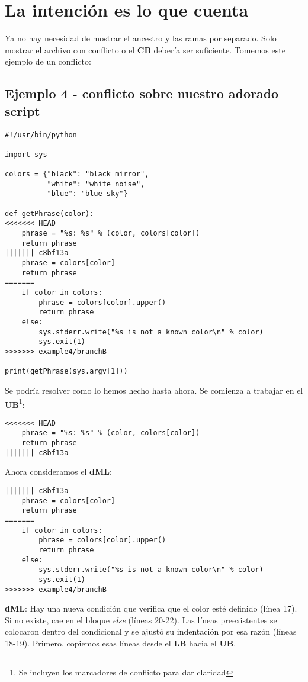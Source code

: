 
\section{La intención es lo que cuenta}
Ya no hay necesidad de mostrar el ancestro y las ramas por separado. Solo mostrar el archivo con conflicto
o el {\bf CB} debería ser suficiente. Tomemos este ejemplo de un conflicto:

\subsection{Ejemplo 4 - conflicto sobre nuestro adorado script}
\label{example_04}

\begin{lstlisting}[style=python_style, caption={\bf Ejemplo 4}]
#!/usr/bin/python

import sys

colors = {"black": "black mirror",
          "white": "white noise",
          "blue": "blue sky"}

def getPhrase(color):
<<<<<<< HEAD
    phrase = "%s: %s" % (color, colors[color])
    return phrase
||||||| c8bf13a
    phrase = colors[color]
    return phrase
=======
    if color in colors:
        phrase = colors[color].upper()
        return phrase
    else:
        sys.stderr.write("%s is not a known color\n" % color)
        sys.exit(1)
>>>>>>> example4/branchB

print(getPhrase(sys.argv[1]))
\end{lstlisting}

Se podría resolver como lo hemos hecho hasta ahora. Se comienza a trabajar en el {\bf UB}\footnote{Se incluyen
los marcadores de conflicto para dar claridad}:
\begin{lstlisting}[style=python_style, firstnumber=10, caption={\bf Ejemplo 4} - Paso 1 - UB]
<<<<<<< HEAD
    phrase = "%s: %s" % (color, colors[color])
    return phrase
||||||| c8bf13a
\end{lstlisting}

Ahora consideramos el {\bf dML}:
\begin{lstlisting}[style=python_style, firstnumber=13, caption={\bf Ejemplo 4} - Paso 2 - dML]
||||||| c8bf13a
    phrase = colors[color]
    return phrase
=======
    if color in colors:
        phrase = colors[color].upper()
        return phrase
    else:
        sys.stderr.write("%s is not a known color\n" % color)
        sys.exit(1)
>>>>>>> example4/branchB
\end{lstlisting}
{\bf dML}: Hay una nueva condición que verifica que el color esté definido (línea 17). Si no existe, cae en el bloque {\it else}
(líneas 20-22). Las líneas preexistentes se colocaron dentro del condicional y se ajustó su indentación por esa razón (líneas
18-19). Primero, copiemos esas líneas desde el {\bf LB} hacia el {\bf UB}.

